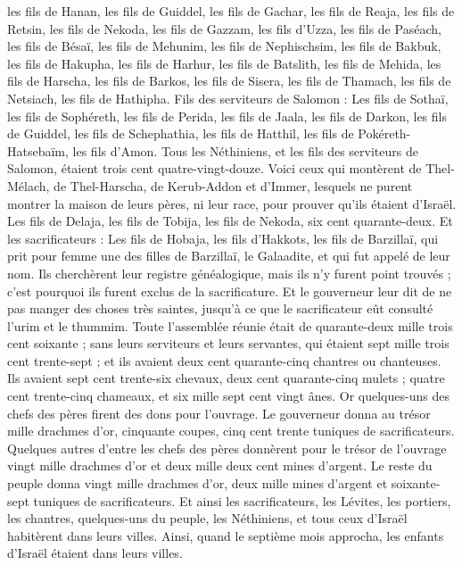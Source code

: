 \begin{multicols}{2}
les fils de Hanan, les fils de Guiddel, les fils de Gachar,
les fils de Reaja, les fils de Retsin, les fils de Nekoda,
les fils de Gazzam, les fils d’Uzza, les fils de Paséach,
les fils de Bésaï, les fils de Mehunim, les fils de Nephischsim,
les fils de Bakbuk, les fils de Hakupha, les fils de Harhur,
les fils de Batslith, les fils de Mehida, les fils de Harscha,
les fils de Barkos, les fils de Sisera, les fils de Thamach,
les fils de Netsiach, les fils de Hathipha.
Fils des serviteurs de Salomon : Les fils de Sothaï, les fils de Sophéreth, les fils de Perida,
les fils de Jaala, les fils de Darkon, les fils de Guiddel,
les fils de Schephathia, les fils de Hatthil, les fils de Pokéreth-Hatsebaïm, les fils d'Amon.
Tous les Néthiniens, et les fils des serviteurs de Salomon, étaient trois cent quatre-vingt-douze.
Voici ceux qui montèrent de Thel-Mélach, de Thel-Harscha, de Kerub-Addon et d'Immer, lesquels ne purent montrer la maison de leurs pères, ni leur race, pour prouver qu’ils étaient d'Israël.
Les fils de Delaja, les fils de Tobija, les fils de Nekoda, six cent quarante-deux.
Et les sacrificateurs : Les fils de Hobaja, les fils d'Hakkots, les fils de Barzillaï, qui prit pour femme une des filles de Barzillaï, le Galaadite, et qui fut appelé de leur nom.
Ils cherchèrent leur registre généalogique, mais ils n'y furent point trouvés ; c'est pourquoi ils furent exclus de la sacrificature.
Et le gouverneur leur dit de ne pas manger des choses très saintes, jusqu'à ce que le sacrificateur eût consulté l'urim et le thummim.
Toute l'assemblée réunie était de quarante-deux mille trois cent soixante ;
sans leurs serviteurs et leurs servantes, qui étaient sept mille trois cent trente-sept ; et ils avaient deux cent quarante-cinq chantres ou chanteuses.
Ils avaient sept cent trente-six chevaux, deux cent quarante-cinq mulets ;
quatre cent trente-cinq chameaux, et six mille sept cent vingt ânes.
Or quelques-uns des chefs des pères firent des dons pour l'ouvrage. Le gouverneur donna au trésor mille drachmes d'or, cinquante coupes, cinq cent trente tuniques de sacrificateurs.
Quelques autres d'entre les chefs des pères donnèrent pour le trésor de l'ouvrage vingt mille drachmes d'or et deux mille deux cent mines d'argent.
Le reste du peuple donna vingt mille drachmes d'or, deux mille mines d'argent et soixante-sept tuniques de sacrificateurs.
Et ainsi les sacrificateurs, les Lévites, les portiers, les chantres, quelques-uns du peuple, les Néthiniens, et tous ceux d'Israël habitèrent dans leurs villes. Ainsi, quand le septième mois approcha, les enfants d'Israël étaient dans leurs villes.

\end{multicols}
